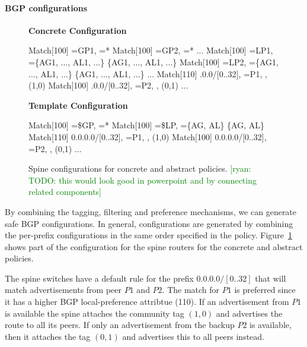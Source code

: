 \documentclass{sig-alternate-10pt}
\newcommand{\ryan}[1]{\textcolor{green}{[ryan: #1]}}
\newcommand{\para}[1]{\paragraph*{\textbf{#1}}}
\newcommand{\hdr}[2]{\flushleft \chdr{\hspace{5mm}#1}{#2}}
\newcommand{\chdr}[2]{\textbf{#1} {#2} \\ \centering}%
\begin{document}
\para{BGP configurations}

\begin{figure}[t!]
  \begin{minipage}[t]{.54\linewidth}
    \hdr{Concrete Configuration}{}
    \begin{code}
        Match[100] \PREFIX=GP1, \PEER=*
          \PEER \Arrow *
        Match[100] \PREFIX=GP2, \PEER=*
          \PEER \Arrow *
        ...
        Match[100] \PREFIX=LP1, \PEER=\{AG1, ..., AL1, ...\}
          \PEER \Arrow \{AG1, ..., AL1, ...\}
        Match[100] \PREFIX=LP2, \PEER=\{AG1, ..., AL1, ...\}
          \PEER \Arrow \{AG1, ..., AL1, ...\}
        ...
        Match[110] .0.0/[0..32], \PEER=P1, 
          \PEER \Arrow *, \COMM \Arrow (1,0)
        Match[100] .0.0/[0..32], \PEER=P2, 
          \PEER \Arrow *, \COMM \Arrow (0,1)
        ...
      \end{code}
  \end{minipage}
  \begin{minipage}[t]{.4\linewidth}
    \hdr{Template Configuration}{}
    \begin{code}
        Match[100] \PREFIX=\$GP, \PEER=*
          \PEER \Arrow *
        Match[100] \PREFIX=\$LP, \PEER=\{AG, AL\}
          \PEER \Arrow \{AG, AL\}
        Match[110] 0.0.0.0/[0..32], \PEER=P1, 
          \PEER \Arrow *, \COMM \Arrow (1,0)
        Match[100] 0.0.0.0/[0..32], \PEER=P2, 
          \PEER \Arrow *, \COMM \Arrow (0,1)
        ...
      \end{code}
  \end{minipage}%

  \hrulefill
  \vspace*{.4em}%

  \caption{Spine configurations for concrete and abstract policies. \ryan{TODO: this would look good in powerpoint and by connecting related components}}
  \label{fig:bgp-configs}
\end{figure}

By combining the tagging, filtering and preference mechanisms, we can generate safe BGP configurations. In general, configurations are generated by combining the per-prefix configurations in the same order specified in the policy. Figure~\ref{fig:bgp-configs} shows part of the configuration for the spine routers for the concrete and abstract policies. 

The spine switches have a default rule for the prefix $0.0.0.0/[0..32]$ that will match advertisements from peer $P1$ and $P2$. The match for $P1$ is preferred since it has a higher BGP local-preference attribtue (110). If an advertisement from $P1$ is available the spine attaches the community tag $(1,0)$ and advertises the route to all its peers. If only an advertisement from the backup $P2$ is available, then it attaches the tag $(0,1)$ and advertises this to all peers instead. 
\end{document}
